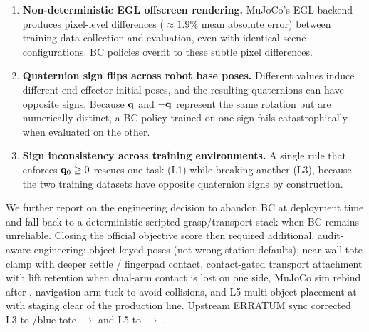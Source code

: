 \begin{enumerate}[leftmargin=*,itemsep=2pt]
    \item \textbf{Non-deterministic EGL offscreen rendering.} MuJoCo's EGL backend produces pixel-level differences ($\approx 1.9\%$ mean absolute error) between training-data collection and evaluation, even with identical scene configurations. BC policies overfit to these subtle pixel differences.
    \item \textbf{Quaternion sign flips across robot base poses.} Different  values induce different end-effector initial poses, and the resulting quaternions can have opposite signs. Because $\mathbf{q}$ and $-\mathbf{q}$ represent the same rotation but are numerically distinct, a BC policy trained on one sign fails catastrophically when evaluated on the other.
    \item \textbf{Sign inconsistency across training environments.} A single  rule that enforces $\mathbf{q}_0 \geq 0$ rescues one task (L1) while breaking another (L3), because the two training datasets have opposite quaternion signs by construction.
\end{enumerate}

We further report on the engineering decision to abandon BC at deployment time and fall back to a deterministic scripted grasp/transport stack when BC remains unreliable. Closing the official objective score then required additional, audit-aware engineering: object-keyed poses (not wrong station defaults), near-wall tote clamp with deeper settle / fingerpad contact, contact-gated transport attachment with lift retention when dual-arm contact is lost on one side, MuJoCo sim rebind after , navigation arm tuck to avoid collisions, and L5 multi-object placement at  with staging clear of the production line. Upstream ERRATUM sync corrected L3 to /blue tote $\rightarrow$  and L5 to  $\rightarrow$ .


